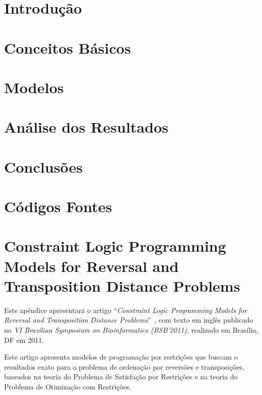 \documentclass[12pt]{report} %
\begin{document}






\afterpreface %

\chapter{Introdução}
\label{cap:intro}


\chapter{Conceitos Básicos}
\label{cap:basic}


\chapter{Modelos}
\label{cap:model}


\chapter{Análise dos Resultados}
\label{cap:resul}


\chapter{Conclusões}
\label{cap:concl}


\appendix

\chapter{Códigos Fontes}
\label{app:src_code}


\chapter[CLP Models for Reversal and Transposition Distance
Problems]{Constraint Logic Programming Models for Reversal and
Transposition Distance Problems}
\label{app:artigo}
Este apêndice apresentará o artigo ``\textit{Constraint Logic
Programming Models for Reversal and Transposition Distance
Problems}''~\cite{IizukaDias*2011}, com texto em inglês publicado no
\textit{VI Brazilian Symposium on Bioinformatics (BSB'2011)}, realizado
em Brasília, DF em 2011.

Este artigo apresenta modelos de programação por restrições que buscam o
resultados exato para o problema de ordenação por reversões e
transposições, baseados na teoria do Problema de Satisfação por
Restrições e na teoria do Problema de Otimização com Restrições.





\end{document}
